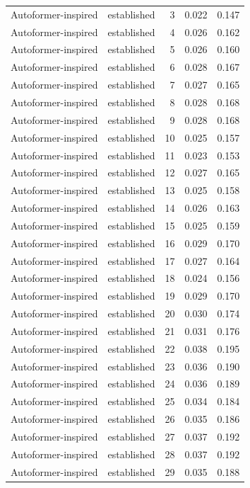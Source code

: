 \begin{tabular}{llrrr}
Autoformer-inspired & established & 3 & 0.022 & 0.147 \\
Autoformer-inspired & established & 4 & 0.026 & 0.162 \\
Autoformer-inspired & established & 5 & 0.026 & 0.160 \\
Autoformer-inspired & established & 6 & 0.028 & 0.167 \\
Autoformer-inspired & established & 7 & 0.027 & 0.165 \\
Autoformer-inspired & established & 8 & 0.028 & 0.168 \\
Autoformer-inspired & established & 9 & 0.028 & 0.168 \\
Autoformer-inspired & established & 10 & 0.025 & 0.157 \\
Autoformer-inspired & established & 11 & 0.023 & 0.153 \\
Autoformer-inspired & established & 12 & 0.027 & 0.165 \\
Autoformer-inspired & established & 13 & 0.025 & 0.158 \\
Autoformer-inspired & established & 14 & 0.026 & 0.163 \\
Autoformer-inspired & established & 15 & 0.025 & 0.159 \\
Autoformer-inspired & established & 16 & 0.029 & 0.170 \\
Autoformer-inspired & established & 17 & 0.027 & 0.164 \\
Autoformer-inspired & established & 18 & 0.024 & 0.156 \\
Autoformer-inspired & established & 19 & 0.029 & 0.170 \\
Autoformer-inspired & established & 20 & 0.030 & 0.174 \\
Autoformer-inspired & established & 21 & 0.031 & 0.176 \\
Autoformer-inspired & established & 22 & 0.038 & 0.195 \\
Autoformer-inspired & established & 23 & 0.036 & 0.190 \\
Autoformer-inspired & established & 24 & 0.036 & 0.189 \\
Autoformer-inspired & established & 25 & 0.034 & 0.184 \\
Autoformer-inspired & established & 26 & 0.035 & 0.186 \\
Autoformer-inspired & established & 27 & 0.037 & 0.192 \\
Autoformer-inspired & established & 28 & 0.037 & 0.192 \\
Autoformer-inspired & established & 29 & 0.035 & 0.188 \\

\end{tabular}
